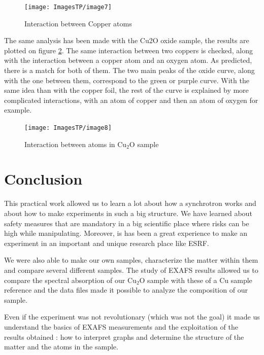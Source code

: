 \documentclass[11pt,a4paper,oneside]{report}
\begin{document}
\begin{figure}[H]
    \begin{center}
        \texttt{[image: ImagesTP/image7]}
        \caption{Interaction between Copper atoms}
        \label{graph4}
    \end{center}
\end{figure}

The same analysis has been made with the Cu2O oxide sample, the results are plotted on figure \ref{graph5}. The same interaction between two coppers is checked, along with the interaction between a copper atom and an oxygen atom. As predicted, there is a match for both of them. The two main peaks of the oxide curve, along with the one between them, correspond to the green or purple curve. With the same idea than with the copper foil, the rest of the curve is explained by more complicated interactions, with an atom of copper and then an atom of oxygen for example.
\begin{figure}[H]
    \begin{center}
        \texttt{[image: ImagesTP/image8]}
        \caption{Interaction between atoms in Cu$_2$O sample}
        \label{graph5}
    \end{center}
\end{figure}

\clearpage
\newpage

\chapter*{Conclusion}

	This practical work allowed us to learn a lot about how a synchrotron works and about how to make experiments in such a big structure. We have learned about safety measures that are mandatory in a big scientific place where risks can be high while manipulating. Moreover, is has been a great experience to make an experiment in an important and unique research place like ESRF.
		
	We were also able to make our own samples, characterize the matter within them and compare several different samples. The study of EXAFS results allowed us to compare the spectral absorption of our Cu$_2$O sample with these of a Cu sample reference and the data files made it possible to analyze the composition of our sample. 
	
	Even if the experiment was not revolutionary (which was not the goal) it made us understand the basics of EXAFS measurements and the exploitation of the results obtained : how to interpret graphs and determine the structure of the matter and the atoms in the sample.

\nocite{*}


\end{document}
